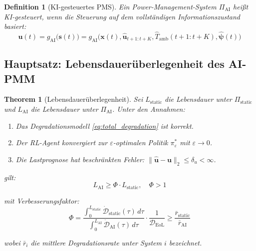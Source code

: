 ﻿\documentclass[12pt,a4paper]{article}
\newtheorem{theorem}{Theorem}[section]
\newtheorem{definition}{Definition}[section]
\begin{document}
	\begin{definition}[KI-gesteuertes PMS]
		Ein Power-Management-System $\Pi_\mathrm{AI}$ heißt KI-gesteuert, wenn
		die Steuerung auf dem vollständigen Informationszustand basiert:
		\begin{equation}
			\mathbf{u}(t) = g_\mathrm{AI}\bigl(\mathbf{s}(t)\bigr) = 
			g_\mathrm{AI}\bigl(\mathbf{x}(t), \hat{\mathbf{u}}_{t+1:t+K},
			\hat{T}_\mathrm{amb}(t+1:t+K), \hat{\boldsymbol{\psi}}(t)\bigr)
		\end{equation}
	\end{definition}
	
	\subsection{Hauptsatz: Lebensdauerüberlegenheit des AI-PMM}
	
	\begin{theorem}[Lebensdauerüberlegenheit]
		\label{thm:lifetime_superiority}
		Sei $L_\mathrm{static}$ die Lebensdauer unter $\Pi_\mathrm{static}$ und
		$L_\mathrm{AI}$ die Lebensdauer unter $\Pi_\mathrm{AI}$. Unter den Annahmen:
		
		\begin{enumerate}[label=(A\arabic*)]
			\item Das Degradationsmodell \eqref{eq:total_degradation} ist korrekt.
			\item Der RL-Agent konvergiert zur $\varepsilon$-optimalen Politik
			$\pi^*_\varepsilon$ mit $\varepsilon \to 0$.
			\item Die Lastprognose hat beschränkten Fehler:
			$\|\hat{\mathbf{u}} - \mathbf{u}\|_2 \leq \delta_u < \infty$.
		\end{enumerate}
		
		gilt:
		\begin{equation}
			L_\mathrm{AI} \geq \Phi \cdot L_\mathrm{static}, \quad \Phi > 1
			\label{eq:lifetime_theorem}
		\end{equation}
		
		mit Verbesserungsfaktor:
		\begin{equation}
			\Phi = \frac{\int_0^{L_\mathrm{static}} \dot{\mathcal{D}}_\mathrm{static}(\tau)\,d\tau}
			{\int_0^{L_\mathrm{AI}} \dot{\mathcal{D}}_\mathrm{AI}(\tau)\,d\tau}
			\cdot \frac{1}{\mathcal{D}_\mathrm{EoL}}
			\geq \frac{\bar{r}_\mathrm{static}}{\bar{r}_\mathrm{AI}}
			\label{eq:phi_factor}
		\end{equation}
		
		wobei $\bar{r}_i$ die mittlere Degradationsrate unter System $i$ bezeichnet.
	\end{theorem}
	
\end{document}
